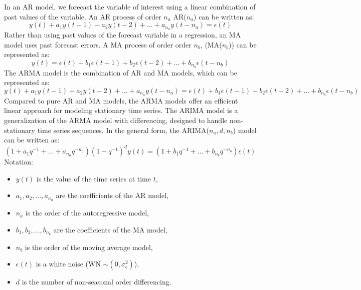 \documentclass[sn-mathphys-num]{sn-jnl}
\theoremstyle{thmstyleone}%
\theoremstyle{thmstyletwo}%
\theoremstyle{thmstylethree}%
\begin{document}
In an AR model, we forecast the variable of interest using a linear combination of past values of the variable.
An AR process of order \( n_a \) AR(\( n_a \))  can be written as:
\[
y(t) + a_1 y(t-1) + a_2 y(t-2) + \dots + a_{n_a} y(t-{n_a}) = \epsilon(t)
\]
Rather than using past values of the forecast variable in a
regression, an MA model uses past forecast errors. A MA process of order order \( n_b \), (MA(\( n_b \))) can be represented as:
\[
y(t) = \epsilon(t) + b_1 \epsilon(t-1) + b_2 \epsilon(t-2) + \dots + b_{n_b} \epsilon(t - n_b)
\]
The ARMA model is the combination of AR and MA models, which can be represented as:
\[
y(t) + a_1 y(t-1) + a_2 y(t-2) + \dots + a_{n_a} y(t-{n_a}) = \epsilon(t) + b_1 \epsilon(t-1) + b_2 \epsilon(t-2) + \dots + b_{n_b} \epsilon(t - n_b)
\]
Compared to pure AR and MA models, the ARMA models offer an efficient linear approach for modeling stationary time series. 
The ARIMA model is a generalization of the ARMA model with differencing, designed to handle non-stationary time series sequences. In the general form, the ARIMA(\(n_a, d, n_b\)) model can be written as:
$$
\left(1+a_1 q^{-1}+\dots+a_{n_a} q^{-n_a}\right)\left(1-q^{-1}\right)^d y(t) = \left(1+b_1 q^{-1}+\dots+b_{n_b} q^{-n_b}\right)\epsilon(t)$$
Notation:
\begin{itemize}
    \item \( y(t) \) is the value of the time series at time \( t \),
    \item \( a_1, a_2, \dots, a_{n_a} \) are the coefficients of the AR model,
    \item \( n_a \) is the order of the autoregressive model,
    \item \( b_1, b_2, \dots, b_{n_b} \) are the coefficients of the MA model,
    \item \( n_b \) is the order of the moving average model,
    \item \( \epsilon(t) \) is a white noise (WN $\sim (0, \sigma_\epsilon^2)$),
    \item \( d \) is the number of non-seasonal order differencing.
\end{itemize}
\end{document}
